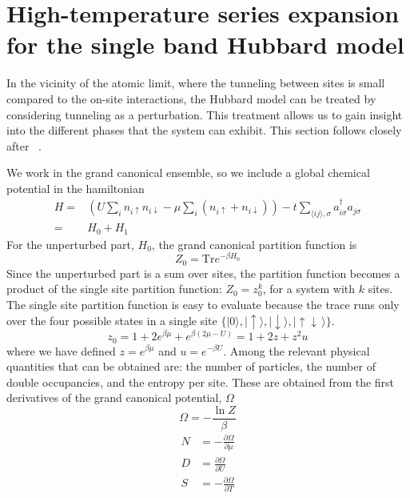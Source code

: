 \documentclass[11pt,letter]{article}
\newcommand{\dbl}{\ensuremath{ \uparrow\! \downarrow \, }}
\newcommand{\spup}{\ensuremath{ \uparrow }}
\newcommand{\spdn}{\ensuremath{ \downarrow}}
\begin{document}
\section{ High-temperature series expansion for the single band Hubbard model }

In the vicinity of the atomic limit, where the tunneling between sites is small
compared to the on-site interactions,  the Hubbard model can be treated by
considering tunneling as a perturbation.   This treatment allows us to gain
insight into the different phases that the system can exhibit.  This section
follows closely after ~\cite{Henderson1992,Jordens2010}.   

We work in the grand canonical ensemble, so we include a global chemical potential
in the hamiltonian
\begin{equation}
\begin{split}
  H = &  
         \left( U\sum_{i} n_{i\spup} n_{i\spdn}  
         - \mu\sum_{i}( n_{i\spup} + n_{i\spdn} ) \right)
-t \sum_{ \langle ij \rangle, \sigma   } 
          a_{i\sigma}^{\dagger}a_{j\sigma} \\
   = &  H_{0} + H_{1} 
\end{split}
\end{equation}
For the unperturbed part, $H_{0}$, the grand canonical partition function is 
\begin{equation}
 Z_{0} = \text{Tr} e^{-\beta H_{0}} 
\end{equation}
Since the unperturbed part is a sum over sites, the partition function becomes
a product of the single site partition function: $Z_{0} = z_{0}^{k}$, for a
system with $k$ sites.  The single site partition function  is easy to
evaluate because the trace runs only over the four possible states in a single
site $\lbrace |0\rangle, |\spup\rangle, |\spdn\rangle, |\dbl\rangle\rbrace$.
\begin{equation}
 z_{0} = 1 + 2 e^{\beta\mu} + e^{\beta (2\mu-U)} = 1 + 2z + z^{2}u 
\end{equation}
where we have defined $z=e^{\beta\mu}$ and $u=e^{-\beta U }$.  Among the
relevant physical quantities that can be obtained are: the number of particles,
the number of double occupancies, and the entropy per site.  These are obtained
from the first derivatives of the grand canonical potential, $\Omega$
\begin{equation}
  \Omega = - \frac{\ln Z}{\beta}
\end{equation}
\begin{align}
  N &=  -\frac{\partial \Omega}{ \partial \mu }\\
  D &=  \frac{\partial \Omega}{ \partial U }  \\
  S &=  -\frac{\partial \Omega}{ \partial T} 
\end{align}
\end{document}

